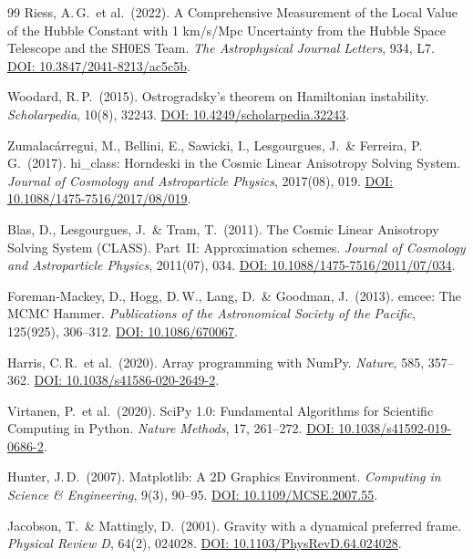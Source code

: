 \documentclass[aps,prd,twocolumn,superscriptaddress,nofootinbib]{revtex4-2}
\begin{document}
\begin{thebibliography}{99}
Riess, A.\,G.\ et al.\ (2022).
A Comprehensive Measurement of the Local Value of the Hubble Constant with 1 km/s/Mpc Uncertainty from the Hubble Space Telescope and the SH0ES Team.
\textit{The Astrophysical Journal Letters}, 934, L7.
\href{https://doi.org/10.3847/2041-8213/ac5c5b}{DOI: 10.3847/2041-8213/ac5c5b}.

Woodard, R.\,P.\ (2015).
Ostrogradsky's theorem on Hamiltonian instability.
\textit{Scholarpedia}, 10(8), 32243.
\href{https://doi.org/10.4249/scholarpedia.32243}{DOI: 10.4249/scholarpedia.32243}.

Zumalac\'arregui, M., Bellini, E., Sawicki, I., Lesgourgues, J.\ \& Ferreira, P.\,G.\ (2017).
hi\_class: Horndeski in the Cosmic Linear Anisotropy Solving System.
\textit{Journal of Cosmology and Astroparticle Physics}, 2017(08), 019.
\href{https://doi.org/10.1088/1475-7516/2017/08/019}{DOI: 10.1088/1475-7516/2017/08/019}.

Blas, D., Lesgourgues, J.\ \& Tram, T.\ (2011).
The Cosmic Linear Anisotropy Solving System (CLASS). Part~II: Approximation schemes.
\textit{Journal of Cosmology and Astroparticle Physics}, 2011(07), 034.
\href{https://doi.org/10.1088/1475-7516/2011/07/034}{DOI: 10.1088/1475-7516/2011/07/034}.

Foreman-Mackey, D., Hogg, D.\,W., Lang, D.\ \& Goodman, J.\ (2013).
emcee: The MCMC Hammer.
\textit{Publications of the Astronomical Society of the Pacific}, 125(925), 306--312.
\href{https://doi.org/10.1086/670067}{DOI: 10.1086/670067}.

Harris, C.\,R.\ et al.\ (2020).
Array programming with NumPy.
\textit{Nature}, 585, 357--362.
\href{https://doi.org/10.1038/s41586-020-2649-2}{DOI: 10.1038/s41586-020-2649-2}.

Virtanen, P.\ et al.\ (2020).
SciPy 1.0: Fundamental Algorithms for Scientific Computing in Python.
\textit{Nature Methods}, 17, 261--272.
\href{https://doi.org/10.1038/s41592-019-0686-2}{DOI: 10.1038/s41592-019-0686-2}.

Hunter, J.\,D.\ (2007).
Matplotlib: A 2D Graphics Environment.
\textit{Computing in Science \& Engineering}, 9(3), 90--95.
\href{https://doi.org/10.1109/MCSE.2007.55}{DOI: 10.1109/MCSE.2007.55}.

Jacobson, T.\ \& Mattingly, D.\ (2001).
Gravity with a dynamical preferred frame.
\textit{Physical Review D}, 64(2), 024028.
\href{https://doi.org/10.1103/PhysRevD.64.024028}{DOI: 10.1103/PhysRevD.64.024028}.


\end{thebibliography}
\end{document}
